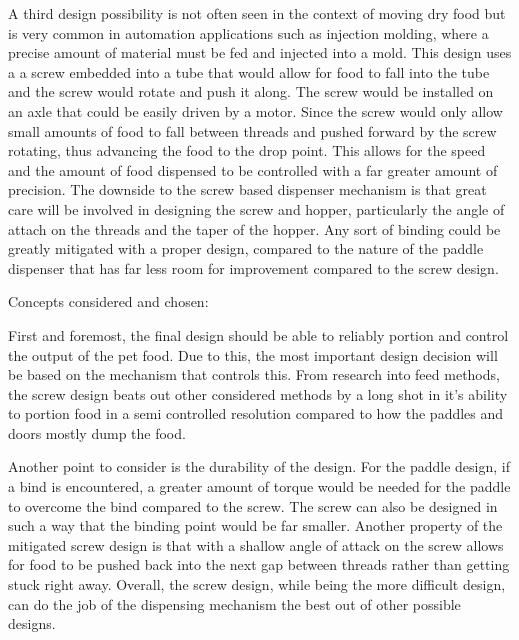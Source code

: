 \documentclass[12pt]{article}
\begin{document}
A third design possibility is not often seen in the context of moving dry food but is very common in automation applications such as injection molding, where a precise amount of material must be fed and injected into a mold. This design uses a a screw embedded into a tube that would allow for food to fall into the tube and the screw would rotate and push it along. The screw would be installed on an axle that could be easily driven by a motor. Since the screw would only allow small amounts of food to fall between threads and pushed forward by the screw rotating, thus advancing the food to the drop point. This allows for the speed and the amount of food dispensed to be controlled with a far greater amount of precision. The downside to the screw based dispenser mechanism is that great care will be involved in designing the screw and hopper, particularly the angle of attach on the threads and the taper of the hopper. Any sort of binding could be greatly mitigated with a proper design, compared to the nature of the paddle dispenser that has far less room for improvement compared to the screw design.

Concepts considered and chosen:

First and foremost, the final design should be able to reliably portion and control the output of the pet food. Due to this, the most important design decision will be based on the mechanism that controls this. From research into feed methods, the screw design beats out other considered methods by a long shot in it’s ability to portion food in a semi controlled resolution compared to how the paddles and doors mostly dump the food.

Another point to consider is the durability of the design. For the paddle design, if a bind is encountered, a greater amount of torque would be needed for the paddle to overcome the bind compared to the screw. The screw can also be designed in such a way that the binding point would be far smaller. Another property of the mitigated screw design is that with a shallow angle of attack on the screw allows for food to be pushed back into the next gap between threads rather than getting stuck right away. Overall, the screw design, while being the more difficult design, can do the job of the dispensing mechanism the best out of other possible designs.
\end{document}

